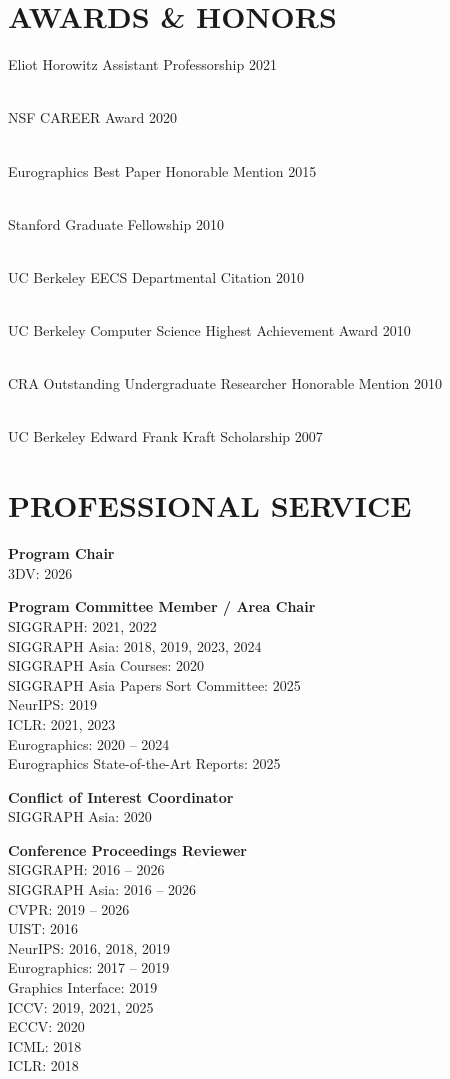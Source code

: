 \documentclass[line,margin]{res}
\begin{document}
\begin{resume}
\section{AWARDS \& HONORS}

\newcommand{\award}[2] {
	#1 \hfill #2
}

\award
{Eliot Horowitz Assistant Professorship}
{2021}
\\
\award
{NSF CAREER Award}
{2020}
\\
\award
{Eurographics Best Paper Honorable Mention}
{2015}
\\
\award
{Stanford Graduate Fellowship}
{2010}
\\
\award
{UC Berkeley EECS Departmental Citation}
{2010}
\\
\award
{UC Berkeley Computer Science Highest Achievement Award}
{2010}
\\
\award
{CRA Outstanding Undergraduate Researcher Honorable Mention}
{2010}
\\
\award
{UC Berkeley Edward Frank Kraft Scholarship}
{2007}


\section{PROFESSIONAL SERVICE}

\textbf{Program Chair}\\
3DV: 2026

\textbf{Program Committee Member / Area Chair}\\
SIGGRAPH: 2021, 2022\\
SIGGRAPH Asia: 2018, 2019, 2023, 2024\\
SIGGRAPH Asia Courses: 2020\\
SIGGRAPH Asia Papers Sort Committee: 2025\\
NeurIPS: 2019\\
ICLR: 2021, 2023\\
Eurographics: 2020 -- 2024\\
Eurographics State-of-the-Art Reports: 2025

\textbf{Conflict of Interest Coordinator}\\
SIGGRAPH Asia: 2020

\textbf{Conference Proceedings Reviewer}\\
SIGGRAPH: 2016 -- 2026\\
SIGGRAPH Asia: 2016 -- 2026\\
CVPR: 2019 -- 2026\\
UIST: 2016\\
NeurIPS: 2016, 2018, 2019\\
Eurographics: 2017 --  2019\\
Graphics Interface: 2019\\
ICCV: 2019, 2021, 2025\\
ECCV: 2020\\
ICML: 2018\\
ICLR: 2018


\end{resume}
\end{document}
